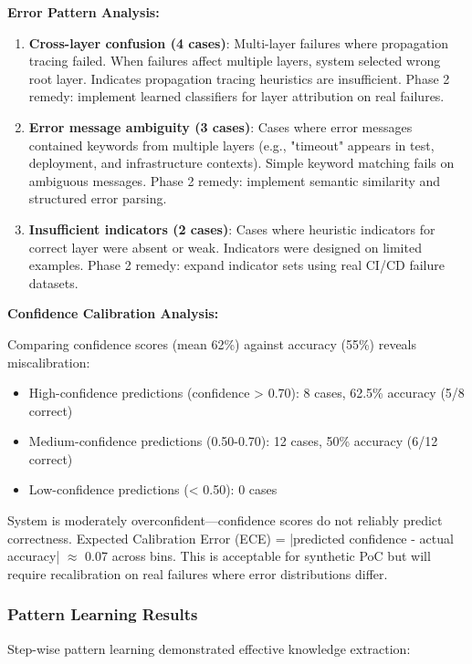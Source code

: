 \documentclass[11pt]{article}
\begin{document}
\textbf{Error Pattern Analysis:}
\begin{enumerate}
    \item \textbf{Cross-layer confusion (4 cases)}: Multi-layer failures where propagation tracing failed. When failures affect multiple layers, system selected wrong root layer. Indicates propagation tracing heuristics are insufficient. Phase 2 remedy: implement learned classifiers for layer attribution on real failures.

    \item \textbf{Error message ambiguity (3 cases)}: Cases where error messages contained keywords from multiple layers (e.g., "timeout" appears in test, deployment, and infrastructure contexts). Simple keyword matching fails on ambiguous messages. Phase 2 remedy: implement semantic similarity and structured error parsing.

    \item \textbf{Insufficient indicators (2 cases)}: Cases where heuristic indicators for correct layer were absent or weak. Indicators were designed on limited examples. Phase 2 remedy: expand indicator sets using real CI/CD failure datasets.
\end{enumerate}

\textbf{Confidence Calibration Analysis:}

Comparing confidence scores (mean 62\%) against accuracy (55\%) reveals miscalibration:
\begin{itemize}
    \item High-confidence predictions (confidence > 0.70): 8 cases, 62.5\% accuracy (5/8 correct)
    \item Medium-confidence predictions (0.50-0.70): 12 cases, 50\% accuracy (6/12 correct)
    \item Low-confidence predictions (< 0.50): 0 cases
\end{itemize}

System is moderately overconfident—confidence scores do not reliably predict correctness. Expected Calibration Error (ECE) = |predicted confidence - actual accuracy| $\approx$ 0.07 across bins. This is acceptable for synthetic PoC but will require recalibration on real failures where error distributions differ.

\subsubsection{Pattern Learning Results}

Step-wise pattern learning demonstrated effective knowledge extraction:
\end{document}
